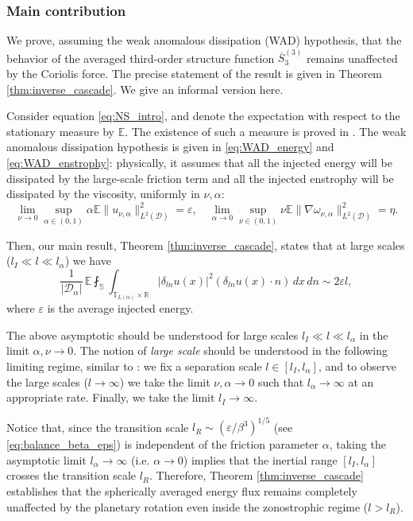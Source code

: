\documentclass[11pt,a4paper]{article}
\numberwithin{equation}{section}
\numberwithin{theorem}{section}
\numberwithin{remark}{section}
\numberwithin{definition}{section}
\begin{document}
\subsubsection{Main contribution}

We prove, assuming the weak anomalous dissipation (WAD) hypothesis, that the behavior of the averaged third-order structure function $\overline{S}^{(3)}_3$ remains unaffected by the Coriolis force. The precise statement of the result is given in Theorem \ref{thm:inverse_cascade}. We give an informal version here.

Consider equation \eqref{eq:NS_intro}, and denote the expectation with respect to the stationary measure by $\mathbb{E}$. The existence of such a measure is proved in \cite{yuriamiraligigliolaWP}. 
The weak anomalous dissipation hypothesis is given in \eqref{eq:WAD_energy} and \eqref{eq:WAD_enstrophy}: physically, it assumes that all the injected energy will be dissipated by the large-scale friction term and all the injected enstrophy will be dissipated by the viscosity, uniformly in $\nu, \alpha$:
\begin{equation*}
    \lim_{\nu \to 0} \sup_{\alpha \in (0,1)} \alpha \mathbb{E}\|u_{\nu,\alpha} \|^2_{L^2(\mathcal{D})}=\varepsilon, \quad  \lim_{\alpha \to 0} \sup_{\nu\in(0,1)} \nu \mathbb{E}\|\nabla \omega_{\nu,\alpha} \|^2_{L^2(\mathcal{D})}=\eta.
\end{equation*}

Then, our main result, Theorem \ref{thm:inverse_cascade}, states that at large scales ($l_I \ll l \ll l_{\alpha}$) we have
\begin{equation} \label{third order def intro}
    \frac{1}{|\mathcal{D}_\alpha|}\,\mathbb{E} \fint_{\mathbb{S}}
    \int_{\mathbb{T}_{L(\alpha)} \times \mathbb{R}}
    |\delta_{ln}u(x)|^2 (\delta_{ln}u(x) \cdot n) \, dx \, dn \sim 2 \varepsilon l,
\end{equation}
where $\varepsilon$ is the average injected energy.

The above asymptotic should be understood for large scales $l_{I}\ll l \ll l_{\alpha}$ in the limit $\alpha,\nu \to 0$. The notion of \textit{large scale} should be understood in the following limiting regime, similar to \cite{bed2D}: we fix a separation scale $l \in [l_I, l_{\alpha}]$, and to observe the large scales ($l \to \infty$) we take the limit $\nu,\alpha \to 0$ such that $l_{\alpha} \to \infty$ at an appropriate rate. Finally, we take the limit $l_{I} \to \infty$.

Notice that, since the transition scale $l_R \sim (\varepsilon/\beta^3)^{1/5}$ (see \eqref{eq:balance_beta_eps}) is independent of the friction parameter $\alpha$, taking the asymptotic limit $l_\alpha \to \infty$ (i.e. $\alpha\to 0$) implies that the inertial range $[l_I, l_\alpha]$ crosses the transition scale $l_R$. Therefore, Theorem \ref{thm:inverse_cascade} establishes that the spherically averaged energy flux remains completely unaffected by the planetary rotation even inside the zonostrophic regime ($l > l_R$).
\end{document}
